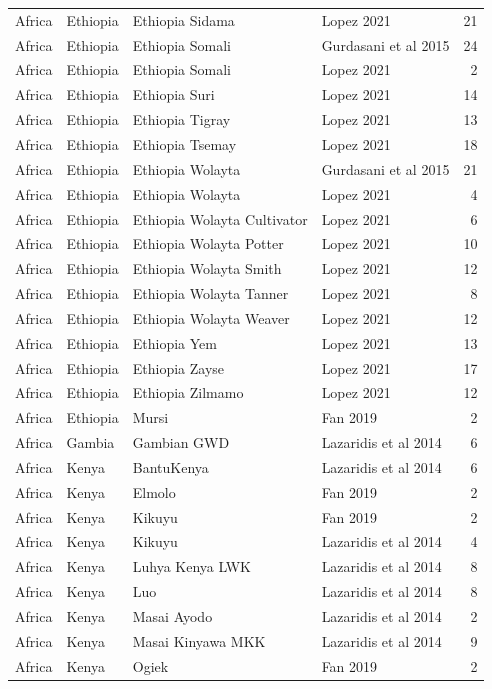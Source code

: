 \begin{longtable}[t]{lll>{\raggedright\arraybackslash}p{9em}r}
Africa & Ethiopia & Ethiopia Sidama & Lopez 2021 & 21\\
Africa & Ethiopia & Ethiopia Somali & Gurdasani et al 2015 & 24\\
Africa & Ethiopia & Ethiopia Somali & Lopez 2021 & 2\\
Africa & Ethiopia & Ethiopia Suri & Lopez 2021 & 14\\
Africa & Ethiopia & Ethiopia Tigray & Lopez 2021 & 13\\
\addlinespace
Africa & Ethiopia & Ethiopia Tsemay & Lopez 2021 & 18\\
Africa & Ethiopia & Ethiopia Wolayta & Gurdasani et al 2015 & 21\\
Africa & Ethiopia & Ethiopia Wolayta & Lopez 2021 & 4\\
Africa & Ethiopia & Ethiopia Wolayta Cultivator & Lopez 2021 & 6\\
Africa & Ethiopia & Ethiopia Wolayta Potter & Lopez 2021 & 10\\
\addlinespace
Africa & Ethiopia & Ethiopia Wolayta Smith & Lopez 2021 & 12\\
Africa & Ethiopia & Ethiopia Wolayta Tanner & Lopez 2021 & 8\\
Africa & Ethiopia & Ethiopia Wolayta Weaver & Lopez 2021 & 12\\
Africa & Ethiopia & Ethiopia Yem & Lopez 2021 & 13\\
Africa & Ethiopia & Ethiopia Zayse & Lopez 2021 & 17\\
\addlinespace
Africa & Ethiopia & Ethiopia Zilmamo & Lopez 2021 & 12\\
Africa & Ethiopia & Mursi & Fan 2019 & 2\\
Africa & Gambia & Gambian GWD & Lazaridis et al 2014 & 6\\
Africa & Kenya & BantuKenya & Lazaridis et al 2014 & 6\\
Africa & Kenya & Elmolo & Fan 2019 & 2\\
\addlinespace
Africa & Kenya & Kikuyu & Fan 2019 & 2\\
Africa & Kenya & Kikuyu & Lazaridis et al 2014 & 4\\
Africa & Kenya & Luhya Kenya LWK & Lazaridis et al 2014 & 8\\
Africa & Kenya & Luo & Lazaridis et al 2014 & 8\\
Africa & Kenya & Masai Ayodo & Lazaridis et al 2014 & 2\\
\addlinespace
Africa & Kenya & Masai Kinyawa MKK & Lazaridis et al 2014 & 9\\
Africa & Kenya & Ogiek & Fan 2019 & 2\\

\end{longtable}
